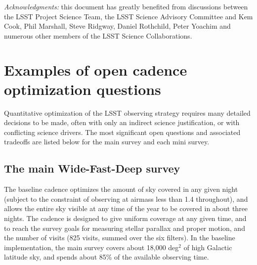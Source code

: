 \documentclass[DM,lsstdraft,toc,usenatbib]{lsstdoc}
\begin{document}
\vskip 0.2in 
{\it Acknowledgments:} this document has greatly benefited from discussions between 
the LSST Project Science Team, the LSST Science Advisory Committee and Kem Cook, 
Phil Marshall, Steve Ridgway, Daniel Rothchild, Peter Yoachim and numerous other members 
of the LSST Science Collaborations. 

\newpage
\appendix
\section{Examples of open cadence optimization questions} 

Quantitative optimization of the LSST observing strategy requires many 
detailed decisions to be made, often with only an indirect science justification,
or with conflicting science drivers.  The most significant open questions and associated 
tradeoffs are listed below for the main survey and each mini survey. 


\subsection{The main Wide-Fast-Deep survey} 

The baseline cadence optimizes the amount of sky covered in any given night (subject to 
the constraint of observing at airmass less than 1.4 throughout), and allows the entire sky 
visible at any time of the year to be covered in about three nights. The cadence is designed 
to give uniform coverage at any given time, and to reach the survey goals for measuring 
stellar parallax and proper motion, and the number of visits (825 visits, summed over the 
six filters). In the baseline implementation, the main survey covers about 18,000 deg$^2$ of 
high Galactic latitude sky, and spends about 85\% of the available observing time. 
\end{document}
